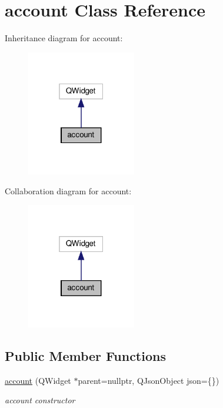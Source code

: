 \hypertarget{classaccount}{}\section{account Class Reference}
\label{classaccount}


Inheritance diagram for account\+:
\nopagebreak
\begin{figure}[H]
\begin{center}
\leavevmode
\includegraphics[width=135pt]{classaccount__inherit__graph}
\end{center}
\end{figure}


Collaboration diagram for account\+:
\nopagebreak
\begin{figure}[H]
\begin{center}
\leavevmode
\includegraphics[width=135pt]{classaccount__coll__graph}
\end{center}
\end{figure}
\subsection*{Public Member Functions}
\begin{DoxyCompactItemize}
\item 
\hyperlink{classaccount_a366fd4d75f8c386ea788b0497e8a7cac}{account} (Q\+Widget $\ast$parent=nullptr, Q\+Json\+Object json=\{\})
\begin{DoxyCompactList}\small\item\em account constructor \end{DoxyCompactList}\end{DoxyCompactItemize}


